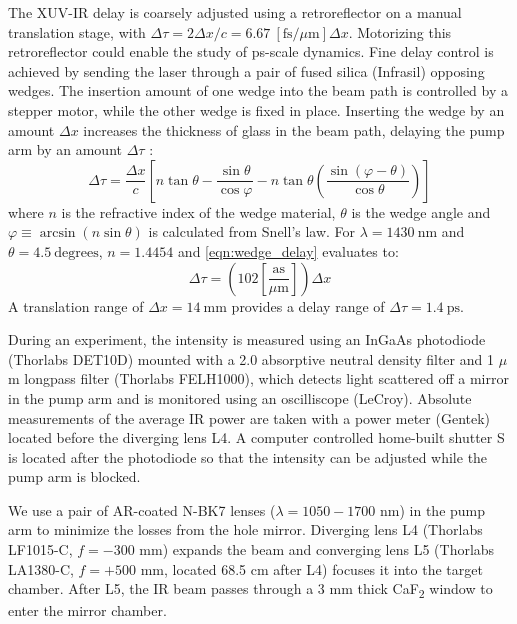 The XUV-IR delay is coarsely adjusted using a retroreflector on a manual translation stage, with $\Delta \tau = 2 \Delta x / c =  6.67 \ \left[ \textrm{fs}/ \mu \textrm{m} \right] \Delta x$. Motorizing this retroreflector could enable the study of ps-scale dynamics. Fine delay control is achieved by sending the laser through a pair of fused silica (Infrasil) opposing wedges. The insertion amount of one wedge into the beam path is controlled by a stepper motor, while the other wedge is fixed in place. Inserting the wedge by an amount $\Delta x$ increases the thickness of glass in the beam path, delaying the pump arm by an amount $\Delta \tau$ \cite{hagemanComplexAttosecondTransientAbsorption2020}:
\begin{equation}
\Delta \tau = \frac{\Delta x}{c} \left[ n \tan \theta - \frac{\sin \theta}{\cos \varphi} - n \tan \theta \left( \frac{\sin \left(\varphi - \theta \right)}{\cos \theta}\right) \right]
\label{eqn:wedge_delay}
\end{equation}
where $n$ is the refractive index of the wedge material, $\theta$ is the wedge angle and ${\varphi \equiv \arcsin \left( n \sin \theta \right)}$ is calculated from Snell's law. For $\lambda = 1430 \ \textrm{nm}$ and $\theta = 4.5 \ \textrm{degrees}$, $n=1.4454$ \cite{malitsonInterspecimenComparisonRefractive1965} and \cref{eqn:wedge_delay} evaluates to:
\begin{equation}
\Delta \tau = \left( 102 \left[ \frac{\textrm{as}}{\mu \textrm{m}}\right]\right) \Delta x
\end{equation}
A translation range of $\Delta x = 14 \ \textrm{mm}$ provides a delay range of $\Delta \tau =  1.4 \ \textrm{ps}$.

During an experiment, the intensity is measured using an InGaAs photodiode (Thorlabs DET10D) mounted with a 2.0 absorptive neutral density filter and 1 $\mu$m longpass filter (Thorlabs FELH1000), which detects light scattered off a mirror in the pump arm and is monitored using an oscilliscope (LeCroy). Absolute measurements of the average IR power are taken with a power meter (Gentek) located before the diverging lens L4. A computer controlled home-built shutter S is located after the photodiode so that the intensity can be adjusted while the pump arm is blocked.

We use a pair of AR-coated N-BK7 lenses ($\lambda = 1050-1700$ nm) in the pump arm to minimize the losses from the hole mirror. Diverging lens L4 (Thorlabs LF1015-C, $f = - 300$ mm) expands the beam and converging lens L5 (Thorlabs LA1380-C, $f = + 500$ mm, located 68.5 cm after L4) focuses it into the target chamber. After L5, the IR beam passes through a 3 mm thick CaF\textsubscript{2} window to enter the mirror chamber.

